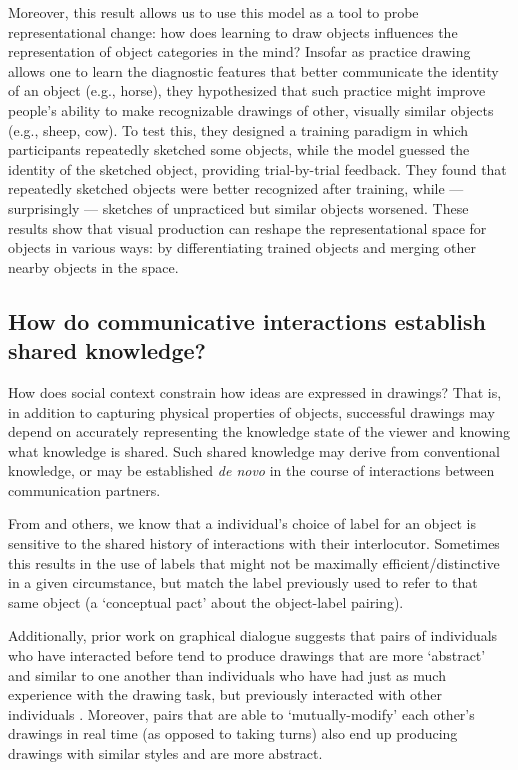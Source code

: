 \documentclass[12pt]{article}
\begin{document}
Moreover, this result allows us to use this model as a tool to probe representational change: how does learning to draw objects influences the representation of object categories in the mind? Insofar as practice drawing allows one to learn the diagnostic features that better communicate the identity of an object (e.g., horse), they hypothesized that such practice might improve people's ability to make recognizable drawings of other, visually similar objects (e.g., sheep, cow). To test this, they designed a training paradigm in which participants repeatedly sketched some objects, while the model guessed the identity of the sketched object, providing trial-by-trial feedback. They found that repeatedly sketched objects were better recognized after training, while --- surprisingly --- sketches of unpracticed but similar objects worsened. These results show that visual production can reshape the representational space for objects in various ways: by differentiating trained objects and merging other nearby objects in the space.

\subsection{How do communicative interactions establish shared knowledge?}

How does social context constrain how ideas are expressed in drawings? That is, in addition to capturing physical properties of objects, successful drawings may depend on accurately representing the knowledge state of the viewer and knowing what knowledge is shared. Such shared knowledge may derive from conventional knowledge, or may be established \textit{de novo} in the course of interactions between communication partners.

From  and others, we know that a individual's choice of label for an object is sensitive to the shared history of interactions with their interlocutor. Sometimes this results in the use of labels that might not be maximally efficient/distinctive in a given circumstance, but match the label previously used to refer to that same object (a ‘conceptual pact’ about the object-label pairing). 

Additionally, prior work on graphical dialogue suggests that pairs of individuals who have interacted before tend to produce drawings that are more `abstract' and similar to one another than individuals who have had just as much experience with the drawing task, but previously interacted with other individuals \cite{Healey:2007vq}. Moreover, pairs that are able to `mutually-modify' each other's drawings in real time (as opposed to taking turns) also end up producing drawings with similar styles and are more abstract.  
\end{document}
